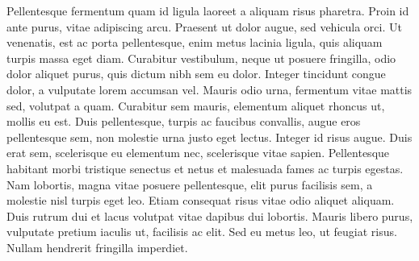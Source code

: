 Pellentesque fermentum quam id ligula laoreet a aliquam risus pharetra. Proin id ante purus, vitae adipiscing arcu. Praesent ut dolor augue, sed vehicula orci. Ut venenatis, est ac porta pellentesque, enim metus lacinia ligula, quis aliquam turpis massa eget diam. Curabitur vestibulum, neque ut posuere fringilla, odio dolor aliquet purus, quis dictum nibh sem eu dolor. Integer tincidunt congue dolor, a vulputate lorem accumsan vel. Mauris odio urna, fermentum vitae mattis sed, volutpat a quam. Curabitur sem mauris, elementum aliquet rhoncus ut, mollis eu est. Duis pellentesque, turpis ac faucibus convallis, augue eros pellentesque sem, non molestie urna justo eget lectus. Integer id risus augue. Duis erat sem, scelerisque eu elementum nec, scelerisque vitae sapien. Pellentesque habitant morbi tristique senectus et netus et malesuada fames ac turpis egestas. Nam lobortis, magna vitae posuere pellentesque, elit purus facilisis sem, a molestie nisl turpis eget leo. Etiam consequat risus vitae odio aliquet aliquam. Duis rutrum dui et lacus volutpat vitae dapibus dui lobortis. Mauris libero purus, vulputate pretium iaculis ut, facilisis ac elit. Sed eu metus leo, ut feugiat risus. Nullam hendrerit fringilla imperdiet. 
